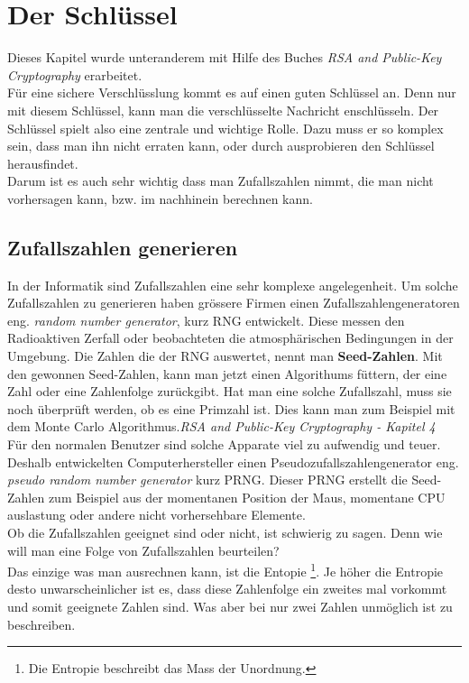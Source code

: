 \newpage
\section{Der Schlüssel}
Dieses Kapitel wurde unteranderem mit Hilfe des Buches \textit{RSA and Public-Key Cryptography} erarbeitet.\\[2ex]

Für eine sichere Verschlüsslung kommt es auf einen guten Schlüssel an. Denn nur mit diesem Schlüssel, kann man die verschlüsselte Nachricht enschlüsseln. Der Schlüssel spielt also eine zentrale und wichtige Rolle. Dazu muss er so komplex sein, dass man ihn nicht erraten kann, oder durch ausprobieren den Schlüssel herausfindet.\\
Darum ist es auch sehr wichtig dass man Zufallszahlen nimmt, die man nicht vorhersagen kann, bzw. im nachhinein berechnen kann.
\subsection{Zufallszahlen generieren}
In der Informatik sind Zufallszahlen eine sehr komplexe angelegenheit. Um solche Zufallszahlen zu generieren haben grössere Firmen einen Zufallszahlengeneratoren eng. \textit{random number generator}, kurz RNG entwickelt. Diese messen den Radioaktiven Zerfall oder beobachteten die atmosphärischen Bedingungen in der Umgebung. Die Zahlen die der RNG auswertet, nennt man \textbf{Seed-Zahlen}. Mit den gewonnen Seed-Zahlen, kann man jetzt einen Algorithums füttern, der eine Zahl oder eine Zahlenfolge zurückgibt. Hat man eine solche Zufallszahl, muss sie noch überprüft werden, ob es eine Primzahl ist. Dies kann man zum Beispiel mit dem Monte Carlo Algorithmus.\textit{RSA and Public-Key Cryptography - Kapitel 4}\\
%
Für den normalen Benutzer sind solche Apparate viel zu aufwendig und teuer. Deshalb entwickelten Computerhersteller einen Pseudozufallszahlengenerator eng. \textit{pseudo random number generator} kurz PRNG. Dieser PRNG erstellt die Seed-Zahlen zum Beispiel aus der momentanen Position der Maus, momentane CPU auslastung oder andere nicht vorhersehbare Elemente.\\
Ob die Zufallszahlen geeignet sind oder nicht, ist schwierig zu sagen. Denn wie will man eine Folge von Zufallszahlen beurteilen?\\
Das einzige was man ausrechnen kann, ist die Entopie \footnote{Die Entropie beschreibt das Mass der Unordnung.}. Je höher die Entropie desto unwarscheinlicher ist es, dass diese Zahlenfolge ein zweites mal vorkommt und somit geeignete Zahlen sind. Was aber bei nur zwei Zahlen unmöglich ist zu beschreiben.
